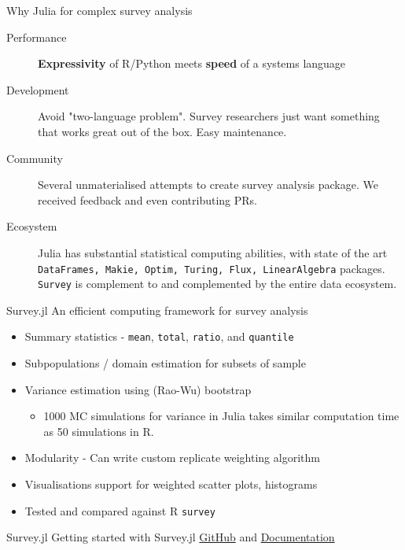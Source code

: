 \documentclass{beamer}          %
\begin{document}
\begin{frame}{Why Julia for complex survey analysis}
	\begin{description}
		\item[Performance]  \textbf{Expressivity} of R/Python meets \textbf{speed}  of a systems language
		\item[Development] Avoid "two-language problem". Survey researchers just want something that works great out of the box. Easy maintenance.
		\item[Community] Several unmaterialised attempts to create survey analysis package. We received feedback and even contributing PRs.\hyperlink{appendix_end}{} 
		\item[Ecosystem] Julia has substantial statistical computing abilities, with state of the art \texttt{DataFrames, Makie, Optim, Turing, Flux, LinearAlgebra} packages. \\ \texttt{Survey} is complement to and complemented by the entire data ecosystem.
	\end{description}			
\end{frame}

\begin{frame}{Survey.jl}  
  An efficient computing framework for survey analysis\\
  \begin{itemize}
  \item Summary statistics - \texttt{mean}, \texttt{total}, \texttt{ratio}, and \texttt{quantile}
  \item Subpopulations / domain estimation for subsets of sample
  \item Variance estimation using (Rao-Wu) bootstrap
  \begin{itemize}
    \item 1000 MC simulations for variance in Julia takes similar computation time as 50 simulations in R.
  \end{itemize}
  \item Modularity - Can write custom replicate weighting algorithm
  \item Visualisations support for weighted scatter plots, histograms
  \item Tested and compared against R \texttt{survey}
   \end{itemize}
\end{frame}

\begin{frame}{Survey.jl}
	Getting started with Survey.jl
	\href{https://github.com/xKDR/Survey.jl}{GitHub} and \href{https://xkdr.github.io/Survey.jl/dev/}{Documentation}
\end{frame}
\end{document}

